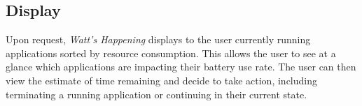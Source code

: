 \subsection{Display} %
Upon request, \emph{Watt's Happening} displays to the user currently running applications sorted by resource consumption.
This allows the user to see at a glance which applications are impacting their battery use rate. %
The user can then view the estimate of time remaining and decide to take action, including terminating a running application or continuing in their current state.
